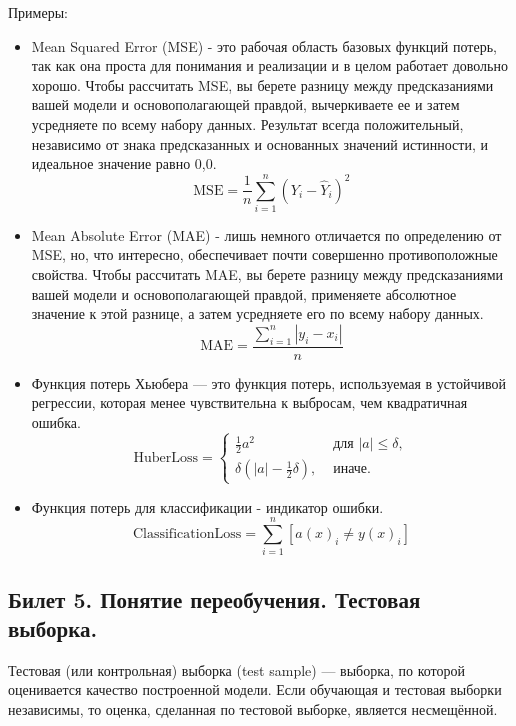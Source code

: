 \documentclass[a4paper, 12pt]{article}
\begin{document}
	Примеры:
	\begin{itemize}
		\item Mean Squared Error (MSE) - это рабочая область базовых функций потерь, так как она проста для понимания и реализации и в целом работает довольно хорошо. Чтобы рассчитать MSE, вы берете разницу между предсказаниями вашей модели и основополагающей правдой, вычеркиваете ее и затем усредняете по всему набору данных.
		Результат всегда положительный, независимо от знака предсказанных и основанных значений истинности, и идеальное значение равно 0,0.
	\begin{equation*}
		\mathrm{MSE}=\frac{1}{n} \sum_{i=1}^{n}\left(Y_{i}-\hat{Y}_{i}\right)^{2}
	\end{equation*}
		\item Mean Absolute Error (MAE) - лишь немного отличается по определению от MSE, но, что интересно, обеспечивает почти совершенно противоположные свойства. Чтобы рассчитать MAE, вы берете разницу между предсказаниями вашей модели и основополагающей правдой, применяете абсолютное значение к этой разнице, а затем усредняете его по всему набору данных.
		\begin{equation*}
			\mathrm{MAE}=\frac{\sum_{i=1}^{n}\left|y_{i}-x_{i}\right|}{n}
		\end{equation*}
	\item Функция потерь Хьюбера — это функция потерь, используемая в устойчивой регрессии, которая менее чувствительна к выбросам, чем квадратичная ошибка.
	\begin{equation}
			\mathrm{HuberLoss}=\left\{\begin{array}{ll}
			\frac{1}{2} a^{2} & \text { для }|a| \leq \delta, \\
			\delta\left(|a|-\frac{1}{2} \delta\right), & \text { иначе. }
		\end{array}\right.
	\end{equation}
	\item Функция потерь для классификации - индикатор ошибки.
	\begin{equation*}
		\mathrm{ClassificationLoss}=\sum_{i=1}^{n} [a(x)_{i} \neq y(x)_{i}]
	\end{equation*}
	\end{itemize}
	\subsection*{Билет 5. Понятие переобучения. Тестовая выборка.}
	Тестовая (или контрольная) выборка (test sample) — выборка, по которой оценивается качество построенной модели. Если обучающая и тестовая выборки независимы, то оценка, сделанная по тестовой выборке, является несмещённой.
	
\end{document}
